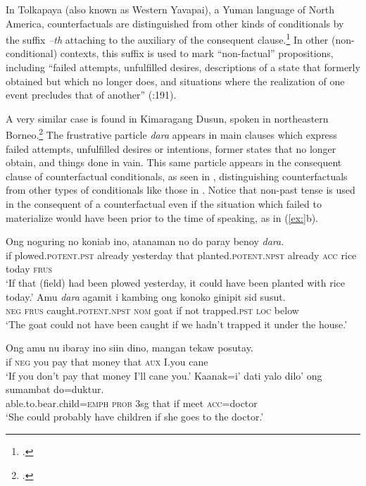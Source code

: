 In Tolkapaya (also known as Western Yavapai), a Yuman language of North America, counterfactuals are distinguished from other kinds of conditionals by the suffix \textit{–th} attaching to the auxiliary of the consequent clause.\footnote{\citet{HardyGordon1980}.} In other (non-conditional) contexts, this suffix is used to mark “non-factual” propositions, including “failed attempts, unfulfilled desires, descriptions of a state that formerly obtained but which no longer does, and situations where the realization of one event precludes that of another” (\citealt{HardyGordon1980}:191).



A very similar case is found in Kimaragang Dusun, spoken in northeastern Borneo.\footnote{\citet{Kroeger2017}.} The frustrative particle \textit{dara} appears in main clauses which express failed attempts, unfulfilled desires or intentions, former states that no longer obtain, and things done in vain. This same particle appears in the consequent clause of counterfactual conditionals, as seen in , distinguishing counterfactuals from other types of conditionals like those in . Notice that non-past tense is used in the consequent of a counterfactual even if the situation which failed to materialize would have been prior to the time of speaking, as in (\ref{ex:}b).


\ea
\ea \gll  Ong  noguring  no  koniab  ino,  atanaman  no   do  paray  benoy  \textit{dara}.\\
if  plowed.\textsc{potent.pst}  already  yesterday  that  planted.\textsc{potent.npst}  already \textsc{acc}  rice  today  \textsc{frus}\\
\glt ‘If that (field) had been plowed yesterday, it could have been planted with rice today.’
\ex \gll  Amu  \textit{dara}  agamit  i  kambing  ong  konoko  ginipit  sid  susut.\\
\textsc{neg}  \textsc{frus}  caught.\textsc{potent.npst}  \textsc{nom}  goat  if  not  trapped\textsc{.pst  loc}  below\\
\glt ‘The goat could not have been caught if we hadn’t trapped it under the house.’
\z \z

\ea
\ea \gll  Ong  amu  nu  ibaray  ino  siin  dino,  mangan  tekaw  posutay.\\
if  \textsc{neg}  you  pay  that  money  that  \textsc{aux}  I.you  cane\\
\glt ‘If you don’t pay that money I’ll cane you.’
\ex \gll  Kaanak=i’  dati  yalo  dilo’  ong  sumambat  do=duktur.\\
able.to.bear.child=\textsc{emph}  \textsc{prob}  3sg  that  if  meet  \textsc{acc}=doctor\\
\glt ‘She could probably have children if she goes to the doctor.’
\z \z


